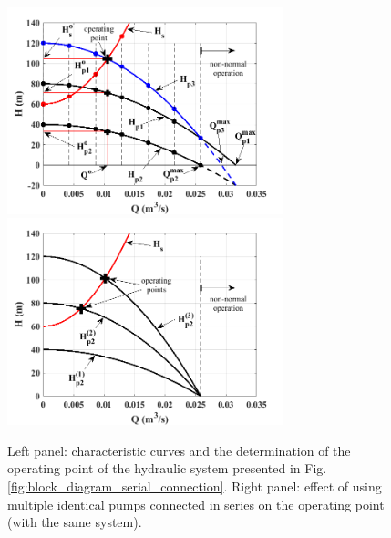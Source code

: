 \begin{figure}[ht!]
	\centering
		\includegraphics[width=8cm]{Control/Figures/TheorySerialConnection.png}
		\includegraphics[width=8cm]{Control/Figures/TheorySerialConnection_SamePumps.png}
	\caption{Left panel: characteristic curves and the determination of the operating point of the hydraulic system presented in Fig.\,\ref{fig:block_diagram_serial_connection}. Right panel: effect of using multiple identical pumps connected in series on the operating point (with the same system).}
	\label{fig:example_serial_connection}
\end{figure}

